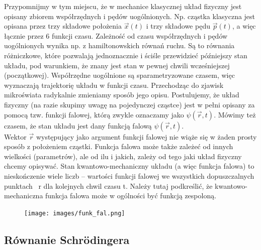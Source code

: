 \documentclass{article}
\begin{document}
Przypomnijmy w tym miejscu, że w mechanice klasycznej układ fizyczny jest opisany zbiorem współrzędnych i pędów uogólnionych. Np. cząstka klasyczna jest opisana przez trzy składowe położenia $\overrightarrow{x}(t)$ i trzy składowe pędu $\overrightarrow{p}(t)$, a więc łącznie przez 6 funkcji czasu. Zależność od czasu współrzędnych i pędów uogólnionych wynika np. z hamiltonowskich równań ruchu. Są to równania różniczkowe, które pozwalają jednoznacznie i ściśle przewidzieć późniejszy stan układu, pod warunkiem, że znany jest stan w pewnej chwili wcześniejszej (początkowej). Współrzędne uogólnione są sparametryzowane czasem, więc wyznaczają trajektorię układu w funkcji czasu. Przechodząc do zjawisk mikroświata radykalnie zmieniamy sposób jego opisu.
Postulujemy, że układ fizyczny (na razie skupimy uwagę na pojedynczej cząstce) jest w pełni opisany za pomocą tzw. funkcji falowej, którą zwykle oznaczamy jako $\psi(\overrightarrow{r},t)$. Mówimy też czasem, że stan układu jest dany funkcją falową $\psi(\overrightarrow{r},t)$. \\

Wektor $\overrightarrow{r}$ występujący jako argument funkcji falowej nie wiąże się w żaden prosty sposób z położeniem cząstki. Funkcja falowa może także zależeć od innych wielkości (parametrów), ale od ilu i jakich, zależy od tego jaki układ fizyczny chcemy opisywać. Stan kwantowo-mechaniczny układu (a więc funkcja falowa) to nieskończenie wiele liczb – wartości funkcji falowej we wszystkich dopuszczalnych punktach ~r dla kolejnych chwil czasu t. Należy tutaj podkreślić, że kwantowo-mechaniczna funkcja falowa może w ogólności być funkcją zespoloną.

\begin{figure}[H]
    \centering
    \texttt{[image: images/funk\_fal.png]}
\end{figure}

\subsection{Równanie Schrödingera}
\end{document}
